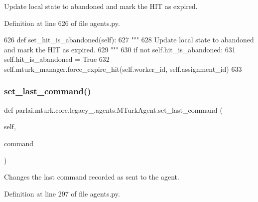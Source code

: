 \begin{DoxyVerb}Update local state to abandoned and mark the HIT as expired.
\end{DoxyVerb}
 

Definition at line 626 of file agents.\+py.


\begin{DoxyCode}
626     \textcolor{keyword}{def }set\_hit\_is\_abandoned(self):
627         \textcolor{stringliteral}{"""}
628 \textcolor{stringliteral}{        Update local state to abandoned and mark the HIT as expired.}
629 \textcolor{stringliteral}{        """}
630         \textcolor{keywordflow}{if} \textcolor{keywordflow}{not} self.hit\_is\_abandoned:
631             self.hit\_is\_abandoned = \textcolor{keyword}{True}
632             self.mturk\_manager.force\_expire\_hit(self.worker\_id, self.assignment\_id)
633 
\end{DoxyCode}
\mbox{\label{classparlai_1_1mturk_1_1core_1_1legacy__2018_1_1agents_1_1MTurkAgent_aff10181ad4291bcab9fb1757751dd35e}} 
\subsubsection{\texorpdfstring{set\+\_\+last\+\_\+command()}{set\_last\_command()}}
{\footnotesize\ttfamily def parlai.\+mturk.\+core.\+legacy\+\_.\+agents.\+M\+Turk\+Agent.\+set\+\_\+last\+\_\+command (\begin{DoxyParamCaption}\item[{}]{self,  }\item[{}]{command }\end{DoxyParamCaption})}

\begin{DoxyVerb}Changes the last command recorded as sent to the agent.
\end{DoxyVerb}
 

Definition at line 297 of file agents.\+py.


